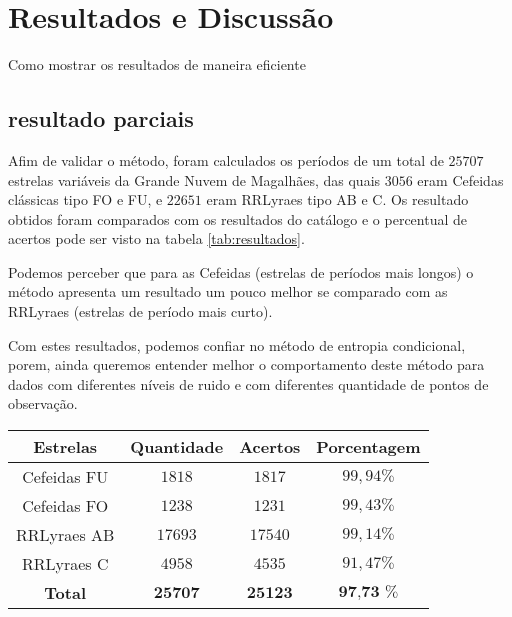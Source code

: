 \chapter{Resultados e Discussão}

Como mostrar os resultados de maneira eficiente

\section{resultado parciais}

Afim de validar o método, foram calculados os períodos de um total de $25707$ estrelas variáveis da Grande Nuvem de Magalhães, das quais $3056$ eram Cefeidas clássicas tipo FO e FU, e $22651$ eram RRLyraes tipo AB e C. Os resultado obtidos foram comparados com os resultados do catálogo e o percentual de acertos pode ser visto na tabela \ref{tab:resultados}.

%


Podemos perceber que para as Cefeidas (estrelas de períodos mais longos) o método apresenta um resultado um pouco melhor se comparado com as RRLyraes (estrelas de período mais curto).


Com estes resultados, podemos confiar no método de entropia condicional, porem, ainda queremos entender melhor o comportamento deste método para dados com diferentes níveis de ruido e com diferentes quantidade de pontos de observação.

\begin{center}
\begin{tabular}{c|c|c|c} 
\hline 
Estrelas & Quantidade & Acertos & Porcentagem \\ 
\hline 
Cefeidas FU & $1818$ & $1817$ & $99,94 \%$ \\ 
Cefeidas FO & $1238$ & $1231$ & $99,43 \%$ \\ 
RRLyraes AB& $17693$ & $17540$ & $99,14 \%$ \\ 
RRLyraes C& $4958$ & $4535$ & $91,47 \%$ \\ 
\textbf{Total} & $\textbf{25707}$ & $\textbf{25123}$ & $\textbf{97,73 \%}$ \\ 
\hline 
\end{tabular} 
\label{tab:resultados}
\end{center}


